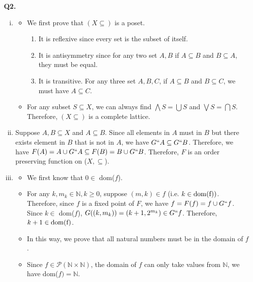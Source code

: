 \documentclass{article}[12pt]
\begin{document}
\noindent \textbf{Q2.}
\begin{enumerate}[(i)]
\item 
\begin{itemize}
\item We first prove that $(X\subseteq)$ is a poset.
\begin{enumerate}
\item It is reflexive since every set is the subset of itself.
\item It is antisymmetry since for any two set $A,B$ if $A\subseteq B$ and $B\subseteq A$, they must be equal.
\item It is transitive. For any three set $A,B,C$, if $A\subseteq B$ and $B\subseteq C$, we must have $A\subseteq C$.
\end{enumerate}
\item For any subset $S\subseteq X$, we can always find $\bigwedge S=\bigcup S$ and $\bigvee S=\bigcap S$. Therefore, $(X\subseteq)$ is a complete lattice.
\end{itemize}
\item Suppose $A,B\subseteq X$ and $A\subseteq B$. Since all elements in $A$ must in $B$ but there exists element in $B$ that is not in $A$, we have $G``A\subseteq G``B$. Therefore, we have $F(A)=A\cup G``A\subseteq F(B)=B\cup G``B$. Therefore, $F$ is an order preserving function on ($X,\subseteq$).
\item \begin{itemize}
\item We first know that 0$\in $ dom($f$).
\item For any $k,m_k\in \mathbb{N},k\geq 0$, suppose $(m,k)\in f$ (i.e. $k\in \rm{dom}(f))$. Therefore, since $f$ is a fixed point of $F$, we have $f=F(f)=f\cup G``f$. Since $k\in$ dom($f$), $G((k,m_k))=(k+1,2^{m_k})\in G``f$. Therefore, $k+1\in \rm{dom}(f)$. 
\item In this way, we prove that all natural numbers must be in the domain of $f$.
\item Since $f\in \mathcal{P}(\mathbb{N}\times \mathbb{N})$, the domain of $f$ can only take values from $\mathbb{N}$, we have dom($f)=\mathbb{N}$.
\end{itemize} 


\end{enumerate}
\end{document}
